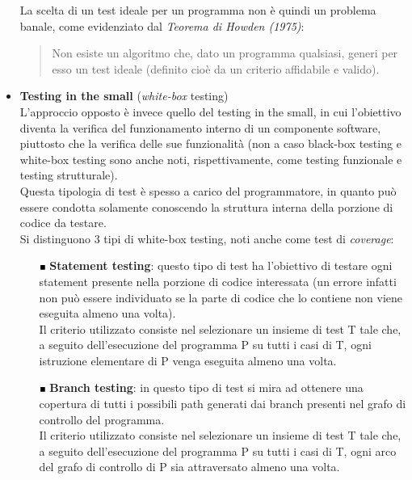 \begin{itemize}
\begin{itemize}
\end{itemize}

La scelta di un test ideale per un programma non è quindi un problema banale, come evidenziato dal \emph{Teorema di Howden (1975)}:\\
\begin{quote}
Non esiste un algoritmo che, dato un programma qualsiasi, generi per esso un test ideale (definito cioè da un criterio affidabile e valido).
\end{quote}

\clearpage

\item \textbf{Testing in the small} (\emph{white-box} testing)\\
L'approccio opposto è invece quello del testing in the small, in cui l'obiettivo diventa la verifica del funzionamento interno di un componente software, piuttosto che la verifica delle sue funzionalità (non a caso black-box testing e white-box testing sono anche noti, rispettivamente, come testing funzionale e testing strutturale).\\ 
Questa tipologia di test è spesso a carico del programmatore, in quanto può essere condotta solamente conoscendo la struttura interna della porzione di codice da testare.\\
Si distinguono 3 tipi di white-box testing, noti anche come test di \emph{coverage}:\\

\begin{itemize}
\item [$ \Blacksquare $] \textbf{Statement testing}: questo tipo di test ha l'obiettivo di testare ogni statement presente nella porzione di codice interessata (un errore infatti non può essere individuato se la parte di codice che lo contiene non viene eseguita almeno una volta).\\
Il criterio utilizzato consiste nel selezionare un insieme di test T tale che, a seguito dell’esecuzione del programma P su tutti i casi di T, ogni istruzione elementare di P venga eseguita almeno una volta.\\

\item [$ \Blacksquare $] \textbf{Branch testing}: in questo tipo di test si mira ad ottenere una copertura di tutti i possibili path generati dai branch presenti nel grafo di controllo del programma.\\
Il criterio utilizzato consiste nel selezionare un insieme di test T tale che, a seguito dell’esecuzione del programma P su tutti i casi di T, ogni arco del grafo di controllo di P sia attraversato almeno una volta.\\


\end{itemize}
\end{itemize}
